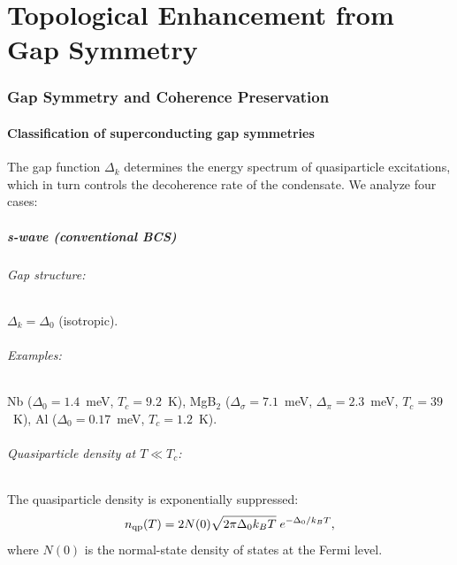 \documentclass[12pt,aps,prd,twocolumn,superscriptaddress,nofootinbib]{revtex4-2}
\begin{document}
\part{Topological Enhancement from Gap Symmetry}

\section{Gap Symmetry and Coherence Preservation}
\label{sec:gap-symmetry}

\subsection{Classification of superconducting gap symmetries}

The gap function $\Delta_k$ determines the energy spectrum of
quasiparticle excitations, which in turn controls the decoherence
rate of the condensate. We analyze four cases:

\subsubsection{s-wave (conventional BCS)}

\paragraph{Gap structure:} $\Delta_k = \Delta_0$ (isotropic).

\paragraph{Examples:} Nb ($\Delta_0 = 1.4$~meV, $T_c = 9.2$~K),
MgB$_2$ ($\Delta_{\sigma} = 7.1$~meV, $\Delta_{\pi} = 2.3$~meV,
$T_c = 39$~K), Al ($\Delta_0 = 0.17$~meV, $T_c = 1.2$~K).

\paragraph{Quasiparticle density at $T \ll T_c$:}
The quasiparticle density is exponentially suppressed:
\begin{equation}\label{eq:nqp-swave}
n_{\rm qp}(T) = 2N(0)\sqrt{2\pi\Delta_0 k_B T}\;
e^{-\Delta_0/k_BT},
\end{equation}
where $N(0)$ is the normal-state density of states at the Fermi level.
\end{document}
